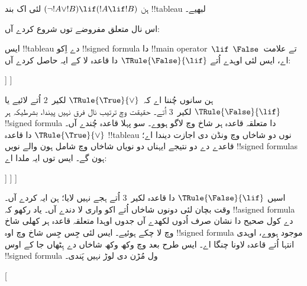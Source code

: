 \documentclass[../../../include/open-logic-section]{subfiles}
\begin{document}
\begin{ex}
ہن $(\lnot !A \lor !B) \lif (!A
\lif !B)$ لئی اک بند !!{tableau} لبھیے۔

اس نال متعلق مفروضے توں شروع کردے آں:
\begin{oltableau}
  [\sFmla{\False}{(\lnot \formula{A} \lor \formula{B}) \lif
      (\formula{A} \lif \formula{B})}, just=\TAss]
\end{oltableau}
ایس !!{tableau} دے اِکو !!{signed formula} دا !!{main operator}~$\lif$
تے علامت~$\False$ اے، ایس لئی اوہدے اُتے $\TRule{\False}{\lif}$
دا قاعدہ لا کے ایہ حاصل کردے آں:
\begin{oltableau}
  [\sFmla{\False}{(\lnot \formula{A} \lor \formula{B})
      \lif (\formula{A} \lif \formula{B})}, just=\TAss, checked
    [\sFmla{\True}{\lnot \formula{A} \lor \formula{B}},
      just={\TRule{\False}{\lif}[1]}
      [\sFmla{\False}{(\formula{A} \lif \formula{B})},
        just={\TRule{\False}{\lif}[1]}
      ]
    ]
  ]
\end{oltableau}
ہن سانوں چُننا اے کہ~$\TRule{\True}{\lor}$ لکیر~$2$ اُتے
لائیے یا $\TRule{\False}{\lif}$ لکیر~$3$ اُتے۔ حقیقت وچ
ترتیب نال فرق نہیں پیندا، بشرطیکہ ہر !!{signed formula} دا
متعلقہ قاعدہ ہر شاخ وچ لاگو ہووے۔ سو پہلا قاعدہ چُندے آں۔
$\TRule{\True}{\lor}$ دا قاعدہ !!{tableau} نوں دو شاخاں وچ
ونڈن دی اجازت دیندا اے؛ قاعدے دے دو نتیجے ایہناں دو نویاں
شاخاں وچ شامل ہون والے نویں !!{signed formula}s ہون گے۔
ایس توں ایہ ملدا اے:
\begin{oltableau}
  [\sFmla{\False}{(\lnot \formula{A} \lor \formula{B}) \lif
      (\formula{A} \lif \formula{B})}, just=\TAss, checked
    [\sFmla{\True}{\lnot \formula{A} \lor \formula{B}},
      just={\TRule{\False}{\lif}[1]}, checked
      [\sFmla{\False}{(\formula{A} \lif \formula{B})},
        just={\TRule{\False}{\lif}[1]}
        [\sFmla{\True}{\lnot \formula{A}}, just={\TRule{\True}{\lor}[2]}]
        [\sFmla{\True}{\formula{B}}, just={\TRule{\True}{\lor}[2]}]
      ]
    ]
  ]
\end{oltableau}
اسیں $\TRule{\False}{\lif}$ دا قاعدہ لکیر~$3$ اُتے ہجے
نہیں لایا؛ ہن ایہ کردے آں۔ وقت بچان لئی دونوں شاخاں اُتے
اکو واری لا دندے آں۔ یاد رکھو کہ !!a{signed formula} دے کول
صحیح دا نشان صرف اُدوں لکھدے آں جدوں اوہدا متعلقہ قاعدہ ہر
کھلی شاخ وچ لا چکے ہوئیے۔ ایس لئی جِس جِس شاخ وچ اوہ
!!{signed formula} موجود ہووے، اوہدی انتہا اُتے قاعدہ لاونا
چنگا اے۔ ایس طرح بعد وچ وکھ وکھ شاخاں دے ہِٹھاں جا کے اوس
!!{signed formula} ول مُڑن دی لوڑ نہیں پَندی۔
\begin{oltableau}
  [
\end{oltableau}
\end{ex}
\end{document}
